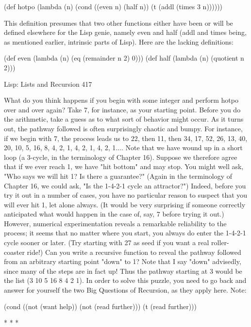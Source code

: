 (def hotpo (lambda (n)
       (cond ((even n) (half n))
              (t (addl (times 3 n))))))

This definition presumes that two other functions either have been or will be defined
elsewhere for the Lisp genie, namely even and half (addl and times being, as
mentioned earlier, intrinsic parts of Lisp). Here are the lacking definitions:

(def even (lambda (n) (eq (remainder n 2) 0)))
(def half (lambda (n) (quotient n 2)))




Lisp: Lists and Recursion                                                             417

        What do you think happens if you begin with some integer and perform hotpo
over and over again? Take 7, for instance, as your starting point. Before you do the
arithmetic, take a guess as to what sort of behavior might occur.
        As it turns out, the pathway followed is often surprisingly chaotic and bumpy.
For instance, if we begin with 7, the process leads us to 22, then 11, then 34, 17, 52,
26, 13, 40, 20, 10, 5, 16, 8, 4, 2, 1, 4, 2, 1, 4, 2, 1.... Note that we have wound up in a
short loop (a 3-cycle, in the terminology of Chapter 16). Suppose we therefore agree
that if we ever reach 1, we have "hit bottom" and may stop. You might well ask,
"Who says we will hit 1? Is there a guarantee?" (Again in the terminology of Chapter
16, we could ask, "Is the 1-4-2-1 cycle an attractor?") Indeed, before you try it out in a
number of cases, you have no particular reason to suspect that you will ever hit 1, let
alone always. (It would be very surprising if someone correctly anticipated what
would happen in the case of, say, 7 before trying it out.) However, numerical
experimentation reveals a remarkable reliability to the process; it seems that no matter
where you start, you always do enter the 1-4-2-1 cycle sooner or later. (Try starting
with 27 as seed if you want a real roller-coaster ride!)
        Can you write a recursive function to reveal the pathway followed from an
arbitrary starting point "down" to 1? Note that I say "down" advisedly, since many of
the steps are in fact up! Thus the pathway starting at 3 would be the list (3 10 5 16 8 4
2 1). In order to solve this puzzle, you need to go back and answer for yourself the
two Big Questions of Recursion, as they apply here. Note:

(cond ((not (want help)) (not (read further)))
       (t (read further)))

                                        *   *   *

